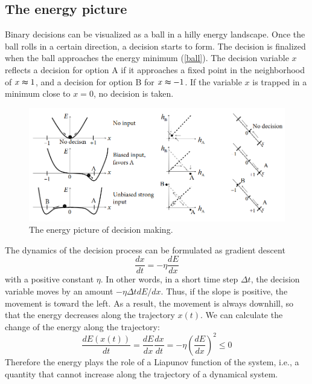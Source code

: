 \documentclass[12pt,hyperref,a4paper,UTF8]{ctexart}
\begin{document}
\subsection{The energy picture}

Binary decisions can be visualized as a ball in a hilly energy landscape. Once the ball rolls in a certain direction, a decision starts to form. The decision is finalized when the ball approaches the energy minimum (\autoref{ball}). The decision variable $x$ reflects a decision for option A if it approaches a fixed point in the neighborhood of $x \thickapprox  1$, and a decision for option B for $x \thickapprox  -1$. If the variable $x$ is trapped in a minimum close to $x = 0$, no decision is taken.

\begin{figure}[h]
    \begin{center}
    \includegraphics[width=\textwidth]{competition4.png}
    \caption{The energy picture of decision making.}
    \label{ball}
    \end{center}
\end{figure}

The dynamics of the decision process can be formulated as gradient descent
$$\frac{dx}{dt}=-\eta \frac{dE}{dx}$$
with a positive constant $\eta$. In other words, in a short time step $\Delta   t$, the decision variable moves by an amount $-\eta \Delta t dE/dx$. Thus, if the slope is positive, the movement is toward the left. As a result, the movement is always downhill, so that the energy decreases along the trajectory $x(t)$. We can calculate the change of the energy along the trajectory:
$$\frac{dE(x(t))}{dt}=\frac{dE}{dx}\frac{dx}{dt}=-\eta \left( \frac{dE}{dx}\right)^2\leq 0$$
Therefore the energy plays the role of a Liapunov function of the system, i.e., a quantity that cannot increase along the trajectory of a dynamical system.
\end{document}
